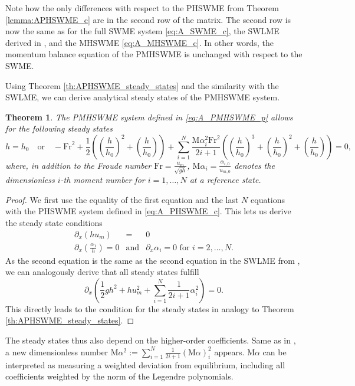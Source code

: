 \documentclass[a4paper, 11pt]{article}
\newtheorem{theorem}{Theorem}
\newcommand{\Fr}{\textrm{Fr}} %
\newcommand{\Ma}{\textrm{M}\alpha} %
\begin{document}
Note how the only differences with respect to the PHSWME from Theorem \ref{lemma:APHSWME_c} are in the second row of the matrix. The second row is now the same as for the full SWME system \eqref{eq:A_SWME_c}, the SWLME derived in \cite{Koellermeier2020i}, and the MHSWME \eqref{eq:A_MHSWME_c}. In other words, the momentum balance equation of the PMHSWME is unchanged with respect to the SWME.

Using Theorem \ref{th:APHSWME_steady_states} and the similarity with the SWLME, we can derive analytical steady states of the PMHSWME system.

\begin{theorem}\label{th:APMHSWME_steady_states}
    The PMHSWME system defined in \eqref{eq:A_PMHSWME_p} allows for the following steady states
    \begin{equation}\label{eq:APMHSWME_steady_states}
        h=h_0 \quad \textrm{or} \quad -\Fr^2 + \frac{1}{2} \left(\left(\frac{h}{h_0}\right)^2+\left(\frac{h}{h_0}\right)\right) + \sum\limits_{i=1}^{N}\frac{\Ma_i^2 \Fr^2}{2i+1}  \left( \left(\frac{h}{h_0}\right)^3+\left(\frac{h}{h_0}\right)^2+\left(\frac{h}{h_0}\right)\right)=0,
    \end{equation}
    where, in addition to the Froude number $\Fr=\frac{u_m}{\sqrt{gh}}$, $\Ma_i = \frac{\alpha_{i,0}}{u_{m,0}}$ denotes the dimensionless $i$-th moment number for $i=1, \ldots, N$ at a reference state.
\end{theorem}
\begin{proof}
    We first use the equality of the first equation and the last $N$ equations with the PHSWME system defined in \eqref{eq:A_PHSWME_c}. This lets us derive the steady state conditions
    \begin{eqnarray}
        \partial_x\left( h u_m \right) &=& 0\\
        \partial_x \left( \frac{\alpha_1}{h} \right) = 0 &\textrm{and}& \partial_x  \alpha_i = 0  \textrm{ for } i=2,\ldots, N.
    \end{eqnarray}
    As the second equation is the same as the second equation in the SWLME from \cite{Koellermeier2020i}, we can analogously derive that all steady states fulfill
    \begin{equation}
        \partial_x \left( \frac{1}{2}gh^2 + h u_m^2 + \sum\limits_{i=1}^{N}\frac{1}{2i+1} \alpha_i^2 \right) = 0.
    \end{equation}
    This directly leads to the condition for the steady states in analogy to Theorem \ref{th:APHSWME_steady_states}.
\end{proof}
The steady states thus also depend on the higher-order coefficients. Same as in \cite{Koellermeier2020i}, a new dimensionless number $\Ma^2:=\sum\limits_{i=1}^N \frac{1}{2 i+1}(\Ma)_i^2$ appears. $\Ma$ can be interpreted as measuring a weighted deviation from equilibrium, including all coefficients weighted by the norm of the Legendre polynomials.\\
\end{document}

